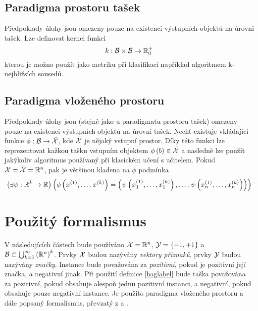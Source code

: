 \subsection{Paradigma prostoru tašek}
Předpoklady úlohy jsou omezeny pouze na existenci výstupních objektů na úrovni tašek. Lze definovat kernel funkci
\begin{equation}
	k : \mathcal B \times \mathcal B \to \mathbb R_0^+
\end{equation}
kterou je možno použít jako metriku při klasifikaci například algoritmem k-nejbližsích sousedů.

\subsection{Paradigma vloženého prostoru}
Předpoklady úlohy jsou (stejně jako u paradigmatu prostoru tašek) omezeny pouze na existenci výstupních objektů na úrovni tašek. Nechť existuje vkládající funkce \( \phi : \mathcal B \to \bar{\mathcal X} \), kde \( \bar{\mathcal X} \) je nějaký vstupní prostor. Díky této funkci lze reprezentovat kažkou tašku vstupním objektem \( \phi \left( b \right) \in \bar{\mathcal X} \) a nasledně lze použít jakýkoliv algoritmus používaný při klasickém učení s učitelem. Pokud \( \mathcal X = \bar{\mathcal X} = \mathbb R^n \), pak je většinou kladena na \( \phi \) podmínka
\begin{equation}
	\left( \exists \psi : \mathbb R^k \to \mathbb R \right) \left( \phi \left( x^{(1)}, \dots, x^{(k)} \right) = \left( \psi \left( x_1^{(1)}, \dots, x_1^{(k)} \right), \dots, \psi \left( x_n^{(1)}, \dots, x_n^{(k)} \right) \right) \right)
\end{equation}

\section{Použitý formalismus}\label{used_formalism}
V následujících částech bude používáno \( \mathcal X = \mathbb R^n \), \( \mathcal Y = \left\{ -1, +1 \right\} \) a \( \mathcal B \subset \bigcup_{k = 1}^{\infty} \left( \mathbb R^n \right) ^k \). Prvky \( \mathcal X \) budou nazývány \textit{vektory příznaků}, prvky \( \mathcal Y \) budou nazývány \textit{značky}. Instance bude považována za \textit{pozitivní}, pokud je pozitivní její značka, a negativní jinak. Při použití definice \ref{baglabel} bude taška považována za pozitivní, pokud obsahuje alespoň jednu pozitivní instanci, a negativní, pokud obsahuje pouze negativní instance. Je použito paradigma vloženého prostoru a dále popsaný formalismus, převzatý z \cite{pevny_using_2016} a \cite{pevny_discriminative_2016}.

